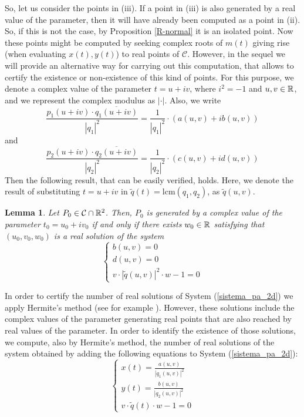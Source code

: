 \documentclass{elsart}
\newtheorem{lemma}[theorem]{{\bf Lemma}}
\begin{document}
So, let us consider the points in (iii). If a point in (iii) is
also generated by a real value of the parameter, then it will have
already been computed as a point in (ii). So, if this is not the
case, by Proposition \ref{R-normal} it is an isolated point. Now
these points might
    be computed by seeking complex
    roots of $m(t)$ giving rise (when evaluating $x(t),y(t)$) to real points of ${\mathcal C}$.
    However, in the sequel we will provide an alternative way for carrying out this computation,
    that allows to certify the existence or non-existence of this kind of points. For this purpose, we denote a
complex value of the parameter $t=u+iv$, where $i^2=-1$ and
$u,v\in {\Bbb R}$, and we represent the complex modulus as $|
\cdot |$. Also, we write
    \[
    \displaystyle{\frac{p_1(u+iv)\cdot \overline{q_1(u+iv)}} {| q_1|^2}}=\displaystyle{\frac{1}{| q_1|^2}}\cdot \left(a(u,v)+ib(u,v)\right)\]
and
\[
\displaystyle{\frac{p_2(u+iv)\cdot \overline{q_2(u+iv)}}{| q_2|^2}}=\displaystyle{\frac{1}{| q_2|^2}}\cdot \left(c(u,v)+id(u,v)\right)
\]
Then the following result, that can be easily verified, holds. Here, we denote
the result of substituting $t=u+iv$ in $\tilde{q}(t)=\mbox{lcm}(q_1,q_2)$, as $\tilde{q}(u,v)$.

\begin{lemma} \label{comp-isol}
Let $P_0\in {\mathcal C}\cap {\Bbb R}^2$. Then, $P_0$ is generated
by a complex value of the parameter $t_0=u_0+iv_0$ if and only if
there exists $w_0\in {\Bbb R}$ satisfying that $(u_0,v_0,w_0)$ is
a real solution of the system
\begin{equation}\label{sistema_pa_2d}
\left\{\begin{array}{c}
b(u,v)=0\\
d(u,v)=0\\
v \cdot |\tilde{q}(u,v)| ^2\cdot w-1=0\end{array}\right.
\end{equation}
\end{lemma}



In order to certify the number of real solutions of System
(\ref{sistema_pa_2d}) we apply Hermite's method (see for example
\cite{cox}). However, these solutions include the complex values
of the parameter generating real points that are also reached by
real values of the parameter. In order to identify the existence
of those solutions, we compute, also by Hermite's method, the
number of real solutions of the system obtained by adding the
following equations to System (\ref{sistema_pa_2d}):
\begin{equation}\label{sistema_pb_2d}
\left\{\begin{array}{c}
x(t)=\displaystyle{\frac{a(u,v)}{| q_1(u,v)|^2}}\\
y(t)=\displaystyle{\frac{b(u,v)}{| q_2(u,v)|^2}}\\
v \cdot \tilde{q}(t)  \cdot w-1=0\end{array}\right.
\end{equation}
\end{document}

